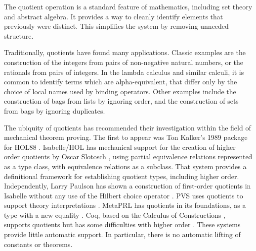 \documentclass[envcountsame,runningheads]{llncs}
\begin{document}
The quotient operation is a standard feature of mathematics,
including set theory and abstract algebra.  It provides a way to
cleanly identify elements that previously were distinct.
This simplifies the system by removing unneeded structure.

Traditionally, quotients have found many applications. 
Classic examples are the construction
of the integers from pairs of non-negative natural numbers,
or
the rationals from pairs of integers. 
In the lambda calculus \cite{Bar81} and similar calculi, it is
common to identify terms which are alpha-equivalent, that differ only by
the choice of local names used by binding operators.
Other examples include the construction of bags from lists by ignoring order,
and the construction of sets from bags by ignoring duplicates.

The ubiquity of quotients has recommended their investigation
within the field of mechanical theorem proving.
The first to appear was Ton Kalker's 1989 package for HOL88 \cite{Kal89}.
Isabelle/HOL
\cite{NiPaWe02}
has mechanical support for the creation of
higher order quotients by Oscar Slotosch \cite{Slo97},
using partial equivalence relations represented as a type class,
with equivalence relations as a subclass.
That system provides a definitional framework for establishing
quotient types, including higher order.
Independently, Larry Paulson has shown a construction of first-order quotients
in Isabelle without any use of the Hilbert choice operator
\cite{LP04}.
PVS uses quotients to support theory interpretations \cite{OwS01}.
MetaPRL has quotients in its foundations,
as a type with a new equality \cite{Nog02}.
Coq, based on the Calculus of Constructions \cite{Hof95},
supports quotients \cite{GPWZ02} but
has some difficulties with higher order
\cite{CPS02}.
These systems provide little automatic support.
In particular, there is no automatic lifting of constants or theorems.
\end{document}
